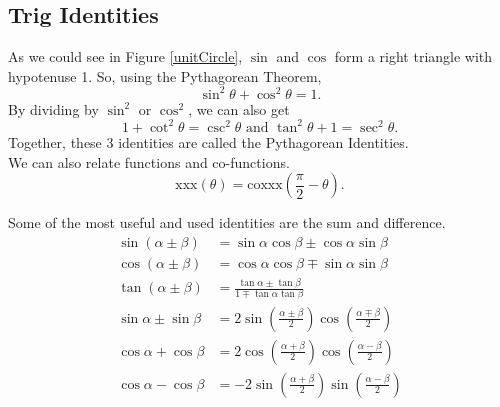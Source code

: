 \subsection{Trig Identities}
\noindent
As we could see in Figure \ref{unitCircle}, $\sin$ and $\cos$ form a right triangle with hypotenuse 1. So, using the Pythagorean Theorem,
\begin{equation*}
	\sin^2{\theta} + \cos^2{\theta} = 1.
\end{equation*}
By dividing by $\sin^2$ or $\cos^2$, we can also get
\begin{equation*}
	1 + \cot^2{\theta} = \csc^2{\theta} \text{ and } \tan^2{\theta} + 1 = \sec^2{\theta}.
\end{equation*}
Together, these 3 identities are called the Pythagorean Identities.\\

\noindent
We can also relate functions and co-functions.
\begin{equation*}
	\text{xxx}(\theta) = \text{coxxx}\left(\frac{\pi}{2} - \theta\right).
\end{equation*}

\noindent
Some of the most useful and used identities are the sum and difference.
\begin{align*}
	\sin{\left(\alpha \pm \beta\right)} &= \sin{\alpha}\cos{\beta} \pm \cos{\alpha}\sin{\beta} \\
	\cos{\left(\alpha \pm \beta\right)} &= \cos{\alpha}\cos{\beta} \mp \sin{\alpha}\sin{\beta} \\
	\tan{\left(\alpha \pm \beta\right)} &= \frac{\tan{\alpha} \pm \tan{\beta}}{1 \mp \tan{\alpha}\tan{\beta}} \\
	\sin{\alpha} \pm \sin{\beta} &= 2\sin{\left(\frac{\alpha \pm \beta}{2}\right)}\cos{\left(\frac{\alpha \mp \beta}{2}\right)} \\
	\cos{\alpha} + \cos{\beta} &= 2\cos{\left(\frac{\alpha + \beta}{2}\right)}\cos{\left(\frac{\alpha - \beta}{2}\right)} \\
	\cos{\alpha} - \cos{\beta} &= -2\sin{\left(\frac{\alpha + \beta}{2}\right)}\sin{\left(\frac{\alpha - \beta}{2}\right)} \\
\end{align*}
